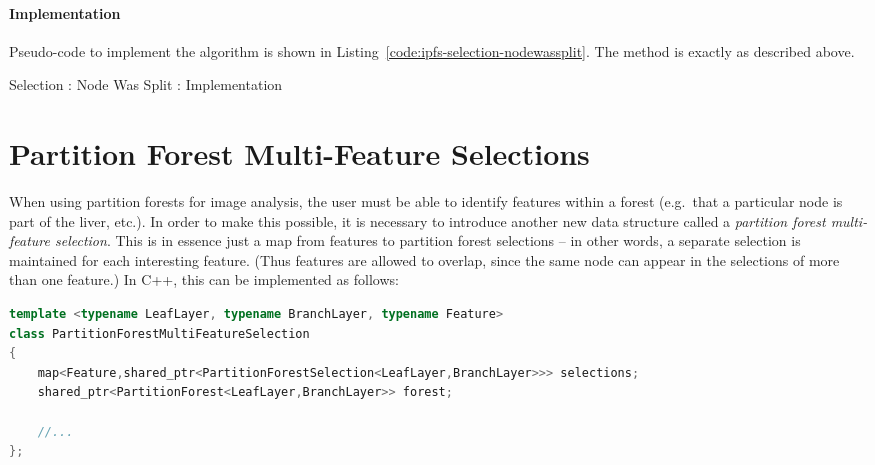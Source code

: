 \paragraph{Implementation}

Pseudo-code to implement the algorithm is shown in Listing~\ref{code:ipfs-selection-nodewassplit}. The method is exactly as described above.

\begin{stulisting}[p]
\caption{Selection : Node Was Split : Implementation}
\label{code:ipfs-selection-nodewassplit}

\end{stulisting}


\afterpage{\clearpage}
\newpage

\section{Partition Forest Multi-Feature Selections}


When using partition forests for image analysis, the user must be able to identify features within a forest (e.g.~that a particular node is part of the liver, etc.). In order to make this possible, it is necessary to introduce another new data structure called a \emph{partition forest multi-feature selection}. This is in essence just a map from features to partition forest selections -- in other words, a separate selection is maintained for each interesting feature. (Thus features are allowed to overlap, since the same node can appear in the selections of more than one feature.) In C++, this can be implemented as follows:

\begin{lstlisting}[style=Default,language=C++,backgroundcolor={\color[gray]{0.8}}]
template <typename LeafLayer, typename BranchLayer, typename Feature>
class PartitionForestMultiFeatureSelection
{
	map<Feature,shared_ptr<PartitionForestSelection<LeafLayer,BranchLayer>>> selections;
	shared_ptr<PartitionForest<LeafLayer,BranchLayer>> forest;

	//...
};
\end{lstlisting}

